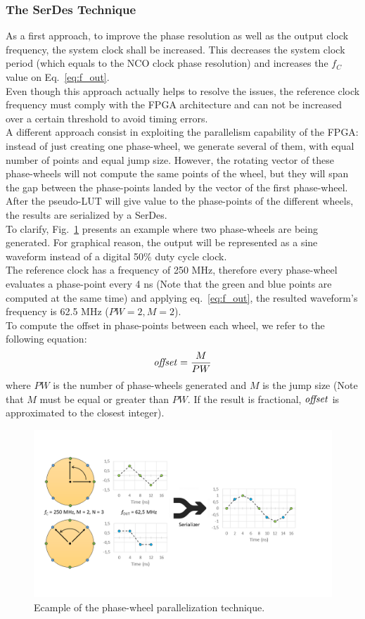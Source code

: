 \documentclass[11pt]{article}
\renewcommand{\>}{\rangle} \renewcommand{\emptyset}{\varnothing}
\begin{document}
\subsubsection{The SerDes Technique}
As a first approach, to improve the phase resolution as well as the output clock
frequency, the system clock shall be increased. This decreases the system clock
period (which equals to the NCO clock phase resolution) and increases the $f_C$
value on Eq.~\ref{eq:f_out}.\\
Even though this approach actually helps to resolve the issues, the reference
clock frequency must comply with the FPGA architecture and can not be increased
over a certain threshold to avoid timing errors.\\
A different approach consist in exploiting the parallelism capability of the
FPGA: instead of just creating one phase-wheel, we generate several of them,
with equal number of points and equal jump size. However, the rotating vector of
these phase-wheels will not compute the same points of the wheel, but they will
span the gap between the phase-points landed by the vector of the first
phase-wheel. After the pseudo-LUT will give value to the phase-points of the
different
wheels, the results are serialized by a SerDes.\\
To clarify, Fig.~\ref{fig:nco_horizontal} presents an example where two
phase-wheels are being generated. For graphical reason, the output will be
represented as a sine waveform instead of a digital 50\% duty cycle clock.\\
The reference clock has a frequency of 250 MHz, therefore every phase-wheel
evaluates a phase-point every 4 ns (Note that the green and blue points are
computed at the same time) and applying eq.~\ref{eq:f_out}, the resulted
waveform's frequency is 62.5 MHz ($PW = 2, M = 2$).\\
To compute the offset in phase-points between each wheel, we refer to the
following equation:
\begin{equation}
  \text{\textit{offset}} = \frac{M}{PW}
  \label{eq:offset}
\end{equation}
where $PW$ is the number of phase-wheels generated and $M$ is the jump size
(Note that $M$ must be equal or greater than $PW$. If the result is fractional,
$\text{\textit{offset}}$ is approximated to the closest integer).
\begin{figure}[h]
  \centerline{\includegraphics[width=0.9\linewidth]{images/nco_horizontal}}
  \caption{Ecample of the phase-wheel parallelization technique.}
  \label{fig:nco_horizontal}
\end{figure}
\end{document}
